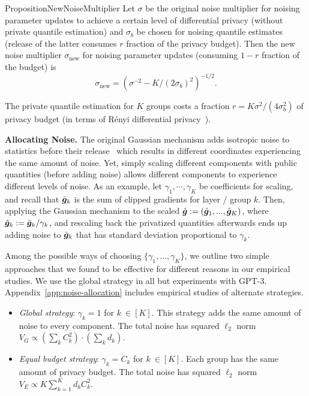 \begin{restatable}{Proposition}{NewNoiseMultiplier} \label{prop:noise-multiplier}
Let $\sigma$ be the original noise multiplier for noising parameter updates to achieve a certain level of differential privacy (without private quantile estimation) and $\sigma_b$ be chosen for noising quantile estimates (release of the latter consumes $r$ fraction of the privacy budget). %
Then the new noise multiplier $\sigma_{\text{new}}$ for noising parameter updates (consuming $1-r$ fraction of the budget) is
\begin{equation}
\sigma_{\text{new}} = (\sigma^{-2}- K/(2\sigma_b)^2)^{-1/2}. \label{eq:sigma_new_sigma_b}    
\end{equation}
\end{restatable}
\begin{Remark}
The private quantile estimation for $K$ groups costs  a fraction $r = K\sigma^2/(4\sigma_b^2)$ of privacy budget (in terms of R\'enyi differential privacy~\citep{mironov2017renyi}). 
\end{Remark}


\textbf{Allocating Noise.} 
The original Gaussian mechanism adds isotropic noise to statistics before their release~\citep{dwork2014algorithmic} which results in different coordinates experiencing the same amount of noise.
Yet, simply scaling different components with public quantities (before adding noise) allows different components to experience different levels of noise. 
As an example, let $\gamma_1, \cdots, \gamma_K$ be coefficients for scaling, and recall that $\tilde{\bm{g}}_k$ is the sum of clipped gradients for layer / group $k$. 
Then, applying the Gaussian mechanism to the scaled $\hat{\bm{g}} := (\hat{\bm{g}}_1, ..., \hat{\bm{g}}_K)$, where $\hat{\bm{g}}_k:={\tilde{\bm{g}}_k}/{\gamma_k}$, and rescaling back the privatized quantities afterwards ends up adding noise to $\tilde{\bm{g}}_k$ that has standard deviation proportional to $\gamma_k$.

Among the possible ways of choosing $\{\gamma_1, ..., \gamma_K\}$, we outline two simple approaches that we found to be effective for different reasons in our empirical studies. We use the global strategy in all but experiments with GPT-3.
Appendix~\ref{app:noise-allocation} includes empirical studies of alternate strategies.
\begin{itemize}[leftmargin=6mm,noitemsep]
    \item \emph{Global strategy}: $\gamma_k = 1$ for $k\ \in [K]$. This strategy adds the same amount of noise to every component.  The total noise has squared $\ell_2$ norm $V_{G}\propto(\sum_{k}C_k^{2})\cdot(\sum_{k}d_{k})$.

    \item \emph{Equal budget strategy}: $\gamma_k = C_k$ for $k\ \in [K]$. Each group has the same amount of privacy budget.  The total noise has squared $\ell_2$ norm $V_{E}\propto K\sum_{k=1}^{K}d_{k}C_k^{2}$.
\end{itemize}




